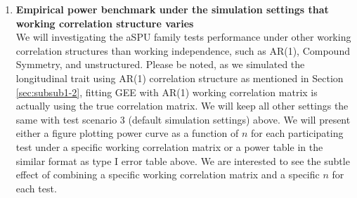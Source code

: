 \documentclass[12pt]{article}
\begin{document}
\begin{enumerate}
%
%

\item \textbf{Empirical power benchmark under the simulation settings that working correlation structure varies}\\
We will investigating the aSPU family tests performance under other working correlation structures than working independence, such as AR(1), Compound Symmetry, and unstructured. Please be noted, as we simulated the longitudinal trait using AR(1) correlation structure as mentioned in Section \ref{sec:subsub1-2}, fitting GEE with AR(1) working correlation matrix is actually using the true correlation matrix. We will keep all other settings the same with test scenario 3 (default simulation settings) above. We will present either a figure plotting power curve as a function of $n$ for each participating test under a specific working correlation matrix or a power table in the similar format as type I error table above. We are interested to see the subtle effect of combining a specific working correlation matrix and a specific $n$ for each test. 
\end{enumerate}
 
\end{document}
